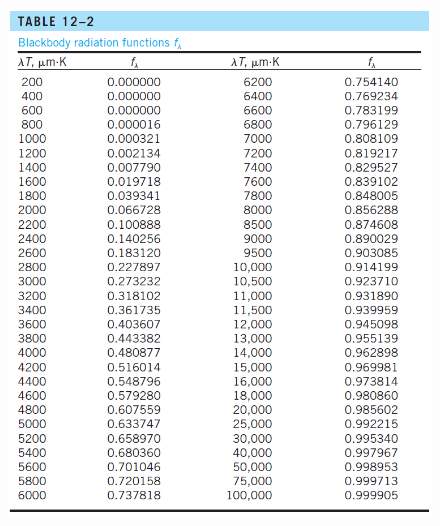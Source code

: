 \begin{itemize}
\begin{itemize}
\begin{figure}[H]
            \includegraphics[width=1.0\linewidth]{images/blackbody_radiation_functions.png}
        \end{figure}
    \end{itemize}
\end{itemize}

